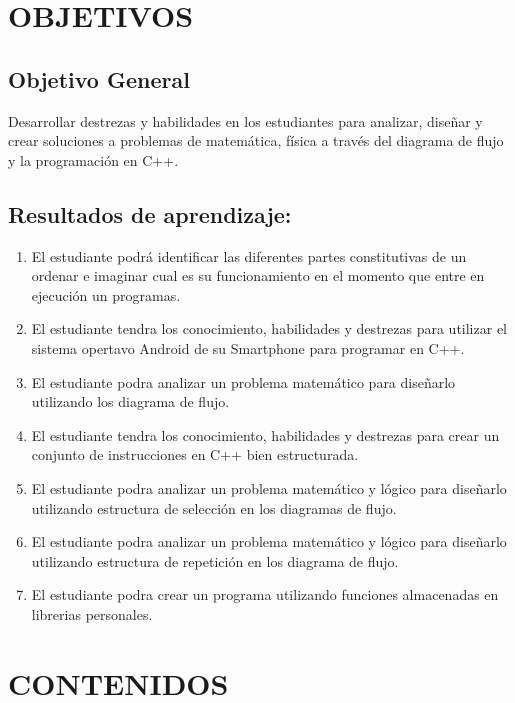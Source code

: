 \documentclass[a4paper,12pt,spanish]{article}
\newcommand{\ResuApreA}{El estudiante podrá identificar las diferentes partes constitutivas de un ordenar e imaginar cual es su funcionamiento en el momento que entre en ejecución un programas.}
\newcommand{\ResuApreB}{El estudiante tendra los conocimiento, habilidades y destrezas para utilizar el sistema opertavo Android de su Smartphone para programar en C++.}
\newcommand{\ResuApreC}{El estudiante podra analizar un problema matemático para diseñarlo utilizando los diagrama de flujo.}
\newcommand{\ResuApreD}{El estudiante tendra los conocimiento, habilidades y destrezas para crear un conjunto de instrucciones en C++ bien estructurada.}
\newcommand{\ResuApreE}{El estudiante podra analizar un problema matemático y lógico para  diseñarlo utilizando estructura de selección en los diagramas de flujo.}
\newcommand{\ResuApreF}{El estudiante podra analizar un problema matemático y lógico para  diseñarlo utilizando estructura de repetición en los diagrama de flujo.}
\newcommand{\ResuApreG}{El estudiante podra crear un programa utilizando funciones almacenadas en librerias personales.}
\begin{document}
\section{OBJETIVOS}
\subsection{Objetivo General}
Desarrollar destrezas y habilidades en los estudiantes para analizar, diseñar y crear soluciones a problemas de matemática, física a través del diagrama de flujo y la programación  en C++.

\subsection{Resultados de aprendizaje:}

\begin{enumerate}
\item \ResuApreA
\item \ResuApreB
\item \ResuApreC
\item \ResuApreD
\item \ResuApreE
\item \ResuApreF
\item \ResuApreG

\end{enumerate}


\section{CONTENIDOS}
\label{sec:contenidos}
\end{document}
